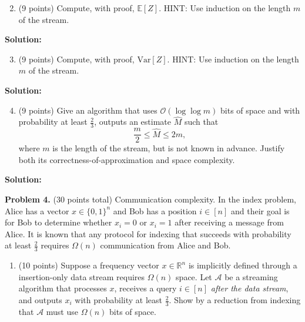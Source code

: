 \documentclass[11pt]{article}
\newcommand{\Ex}[1]{\ensuremath{\mathbb{E}\left[#1\right]}}
\newcommand{\Var}[1]{\ensuremath{\text{Var}\left[#1\right]}}
\begin{document}
\begin{enumerate}
\setcounter{enumi}{1}
\item (9 points)
Compute, with proof, $\Ex{Z}$. 
\vskip 0.1in\noindent
HINT: Use induction on the length $m$ of the stream. 
\end{enumerate}

\noindent\textbf{Solution:}





\begin{enumerate}
\setcounter{enumi}{2}
\item (9 points)
Compute, with proof, $\Var{Z}$. 
\vskip 0.1in\noindent
HINT: Use induction on the length $m$ of the stream. 
\end{enumerate}

\noindent\textbf{Solution:}





\begin{enumerate}
\setcounter{enumi}{3}
\item (9 points)
Give an algorithm that uses $\mathcal{O}(\log\log m)$ bits of space and with probability at least $\frac{2}{3}$, outputs an estimate $\widehat{M}$ such that
\[\frac{m}{2}\le\widehat{M}\le 2m,\]
where $m$ is the length of the stream, but is not known in advance. 
Justify both its correctness-of-approximation and space complexity. 
\end{enumerate}

\noindent\textbf{Solution:}




\newpage\noindent
\textbf{Problem 4.} (30 points total)
Communication complexity.
\vskip 0.1in\noindent
In the index problem, Alice has a vector $x\in\{0,1\}^n$ and Bob has a position $i\in[n]$ and their goal is for Bob to determine whether $x_i=0$ or $x_i=1$ after receiving a message from Alice. 
It is known that any protocol for indexing that succeeds with probability at least $\frac{2}{3}$ requires $\Omega(n)$ communication from Alice and Bob.
\begin{enumerate}
\item (10 points)
Suppose a frequency vector $x\in\mathbb{R}^n$ is implicitly defined through a insertion-only data stream requires $\Omega(n)$ space. 
Let $\mathcal{A}$ be a streaming algorithm that processes $x$, receives a query $i\in[n]$ \emph{after the data stream}, and outputs $x_i$ with probability at least $\frac{2}{3}$. 
Show by a reduction from indexing that $\mathcal{A}$ must use $\Omega(n)$ bits of space. 
\end{enumerate}
\end{document}
